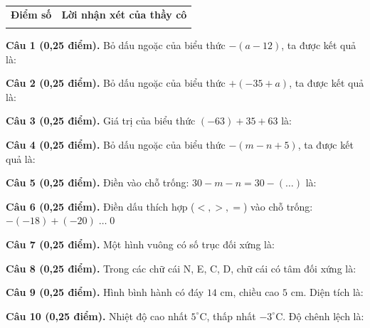 \documentclass[12pt,a4paper]{article}
\begin{document}
\vspace{1.0mm}

\noindent
\begin{tabularx}{\linewidth}{|p{3.2cm}|X|}
\hline
\centering\textbf{Điểm số} & \centering\textbf{Lời nhận xét của thầy cô} \tabularnewline
\rule{0pt}{1.8cm} & \\
\hline
\end{tabularx}

\vspace{1.0mm}
\noindent\textbf{Câu 1 (0,25 điểm).} Bỏ dấu ngoặc của biểu thức $-(a - 12)$, ta được kết quả là: \par\vspace{0.25mm}
\noindent\textbf{Câu 2 (0,25 điểm).} Bỏ dấu ngoặc của biểu thức $+(-35 + a)$, ta được kết quả là: \par\vspace{0.25mm}
\noindent\textbf{Câu 3 (0,25 điểm).} Giá trị của biểu thức $(-63) + 35 + 63$ là: \par\vspace{0.25mm}
\noindent\textbf{Câu 4 (0,25 điểm).} Bỏ dấu ngoặc của biểu thức $-(m - n + 5)$, ta được kết quả là: \par\vspace{0.25mm}
\noindent\textbf{Câu 5 (0,25 điểm).} Điền vào chỗ trống: $30 - m - n = 30 - (\dots)$ là: \par\vspace{0.25mm}
\noindent\textbf{Câu 6 (0,25 điểm).} Điền dấu thích hợp ($<, >, =$) vào chỗ trống: $-(-18) + (-20) \; \dots \; 0$ \shortans{<}\par\vspace{0.25mm}
\noindent\textbf{Câu 7 (0,25 điểm).} Một hình vuông có số trục đối xứng là: \par\vspace{0.25mm}
\noindent\textbf{Câu 8 (0,25 điểm).} Trong các chữ cái N, E, C, D, chữ cái có tâm đối xứng là: \par\vspace{0.25mm}
\noindent\textbf{Câu 9 (0,25 điểm).} Hình bình hành có đáy $14\text{ cm}$, chiều cao $5\text{ cm}$. Diện tích là: \par\vspace{0.25mm}
\noindent\textbf{Câu 10 (0,25 điểm).} Nhiệt độ cao nhất $5^\circ\text{C}$, thấp nhất $-3^\circ\text{C}$. Độ chênh lệch là: \par\vspace{0.25mm}
\end{document}
